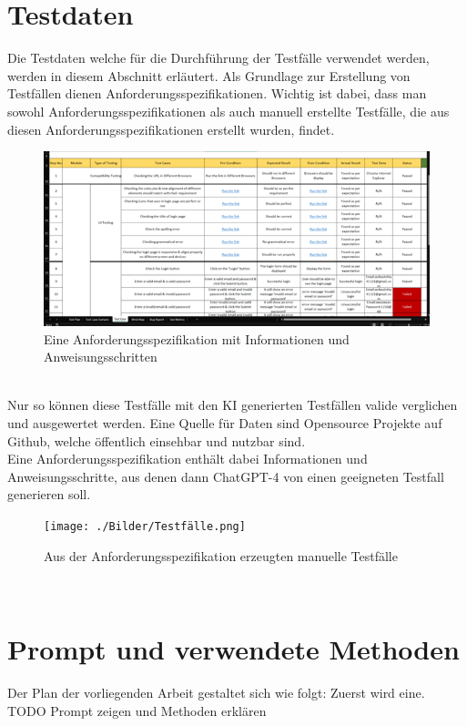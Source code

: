 \documentclass[12pt,toc=bib,toc=listof]{scrreprt}
\begin{document}
\section{Testdaten} %
\label{sec:testdaten}
Die Testdaten welche für die Durchführung der Testfälle verwendet werden, werden in diesem Abschnitt erläutert.
Als Grundlage zur Erstellung von Testfällen dienen Anforderungsspezifikationen. Wichtig ist dabei, dass man sowohl Anforderungsspezifikationen als auch manuell erstellte Testfälle, die aus diesen Anforderungsspezifikationen erstellt wurden, findet.\\
\begin{figure} [h!]
    \centering
    \includegraphics[width=1\linewidth]{./Bilder/Testspezifikationen.png}
    \caption{Eine Anforderungsspezifikation mit Informationen und Anweisungsschritten}
\end{figure}
\\
Nur so können diese Testfälle mit den KI generierten Testfällen valide verglichen und ausgewertet werden. Eine Quelle für Daten sind Opensource Projekte auf Github, welche öffentlich einsehbar und nutzbar sind.\\
\newpage
\noindent Eine Anforderungsspezifikation enthält dabei Informationen und Anweisungsschritte, aus denen dann ChatGPT-4 von \textcite{OpenAI2025} einen geeigneten Testfall generieren soll.\\
\begin{figure} [h!]
    \centering
    \texttt{[image: ./Bilder/Testfälle.png]}
    \caption{Aus der Anforderungsspezifikation erzeugten manuelle Testfälle}
\end{figure}
\\

\section{Prompt und verwendete Methoden} %
\label{sec:promptUndVerwendeteMethoden}
Der Plan der vorliegenden Arbeit gestaltet sich wie folgt: Zuerst wird eine.
TODO Prompt zeigen und Methoden erklären
\end{document}
